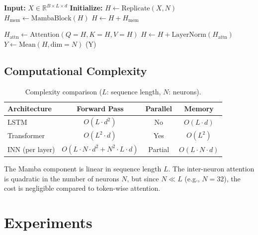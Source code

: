 \documentclass{article}
\begin{document}
\begin{algorithm}[H]
\caption{INN Forward Pass (Simplified)}
\label{alg:inn_forward}
\begin{algorithmic}
\STATE \textbf{Input:} $X \in \mathbb{R}^{B \times L \times d}$
\STATE \textbf{Initialize:} $H \leftarrow \text{Replicate}(X, N)$ 
    \STATE {}
    \STATE $H_{\text{mem}} \leftarrow \text{MambaBlock}(H)$ 
    \STATE $H \leftarrow H + H_{\text{mem}}$ 
    
    \STATE {}
    \STATE $H_{\text{attn}} \leftarrow \text{Attention}(Q=H, K=H, V=H)$ 
    \STATE $H \leftarrow H + \text{LayerNorm}(H_{\text{attn}})$ 
\ENDFOR
\STATE $Y \leftarrow \text{Mean}(H, \text{dim}=N)$ 
\RETURN {}(Y)
\end{algorithmic}
\end{algorithm}

\subsection{Computational Complexity}

\begin{table}[h]
\centering
\caption{Complexity comparison ($L$: sequence length, $N$: neurons).}
\begin{tabular}{lccc}
\toprule
\textbf{Architecture} & \textbf{Forward Pass} & \textbf{Parallel} & \textbf{Memory} \\
\midrule
LSTM & $O(L \cdot d^2)$ & No & $O(L \cdot d)$ \\
Transformer & $O(L^2 \cdot d)$ & Yes & $O(L^2)$ \\
INN (per layer) & $O(L \cdot N \cdot d^2 + N^2 \cdot L \cdot d)$ & Partial & $O(L \cdot N \cdot d)$ \\
\bottomrule
\end{tabular}
\label{tab:complexity}
\end{table}

The Mamba component is linear in sequence length $L$. The inter-neuron attention is quadratic in the number of neurons $N$, but since $N \ll L$ (e.g., $N=32$), the cost is negligible compared to token-wise attention.

\section{Experiments}
\end{document}
